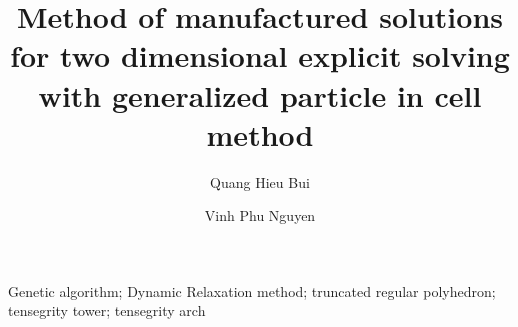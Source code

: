 \documentclass[preprint,3p,12pt]{elsarticle}
\begin{document}
\begin{frontmatter}



\title{\textbf{Method of manufactured solutions for two dimensional explicit solving with generalized particle in cell method}}


\author[1]{Quang Hieu Bui}
\author[2]{Vinh Phu Nguyen}


\address[1]{Faculty of Civil Engineering, The University of Danang-University of Science and Technology, 54 Nguyen Luong Bang, Danang, Vietnam}
\address[2]{Department of Civil Engineering, Monash University, Clayton 3800, VIC, Australia}


\begin{abstract}


\end{abstract}



\begin{keyword}
Genetic algorithm; Dynamic Relaxation method; truncated regular polyhedron; tensegrity tower; tensegrity arch
\end{keyword}

\end{frontmatter}
\end{document}
